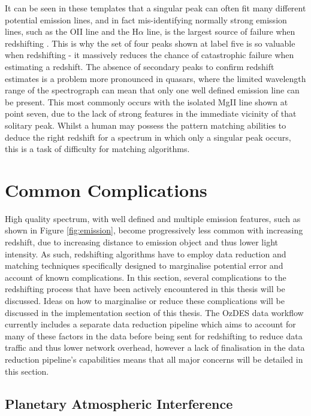 \documentclass[titlesmallcaps, examinerscopy, copyrightpage]{uqthesis}
\begin{document}
It can be seen in these templates that a singular peak can often fit many different potential emission lines, and in fact mis-identifying normally strong emission lines, such as the OII line and the H$\alpha$ line, is the largest source of failure when redshifting \cite{Drinkwater21012010}. This is why the set of four peaks shown at label five is so valuable when redshifting - it massively reduces the chance of catastrophic failure when estimating a redshift. The absence of secondary peaks to confirm redshift estimates is a problem more pronounced in quasars, where the limited wavelength range of the spectrograph can mean that only one well defined emission line can be present. This most commonly occurs with the isolated MgII line shown at point seven, due to the lack of strong features in the immediate vicinity of that solitary peak. Whilst a human may possess the pattern matching abilities to deduce the right redshift for a spectrum in which only a singular peak occurs, this is a task of difficulty for matching algorithms.






\section{Common Complications}

High quality spectrum, with well defined and multiple emission features, such as shown in Figure \ref{fig:emission}, become progressively less common with increasing redshift, due to increasing distance to emission object and thus lower light intensity. As such, redshifting algorithms have to employ data reduction and matching techniques specifically designed to marginalise potential error and account of known complications. In this section, several complications to the redshifting process that have been actively encountered in this thesis will be discussed. Ideas on how to marginalise or reduce these complications will be discussed in the implementation section of this thesis. The OzDES data workflow currently includes a separate data reduction pipeline which aims to account for many of these factors in the data before being sent for redshifting to reduce data traffic and thus lower network overhead, however a lack of finalisation in the data reduction pipeline's capabilities means that all major concerns will be detailed in this section.

\subsection{Planetary Atmospheric Interference}
\end{document}
